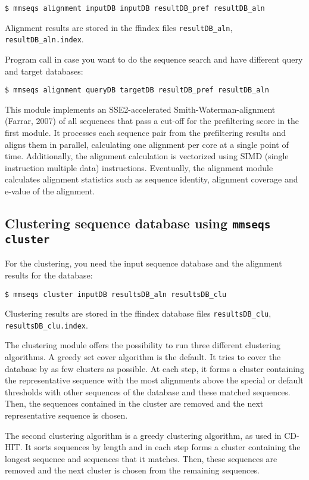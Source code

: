 \documentclass[11pt,a4paper]{report}
\begin{document}
\texttt{\$ mmseqs alignment inputDB inputDB resultDB\_pref resultDB\_aln }

Alignment results are stored in the ffindex files \texttt{resultDB\_aln},
\texttt{resultDB\_aln.index}.

Program call in case you want to do the sequence search and have different
query and target databases:

\texttt{\$ mmseqs alignment queryDB targetDB resultDB\_pref resultDB\_aln }

This module implements an SSE2-accelerated Smith-Waterman-alignment
(Farrar, 2007) of all sequences that pass a cut-off for the prefiltering
score in the first module. It processes each sequence pair from the
prefiltering results and aligns them in parallel, calculating one
alignment per core at a single point of time. Additionally, the alignment
calculation is vectorized using SIMD (single instruction multiple
data) instructions. Eventually, the alignment module calculates alignment
statistics such as sequence identity, alignment coverage and e-value
of the alignment.


\subsection{Clustering sequence database using \texttt{mmseqs cluster}\label{sub:Clustering_module}}

For the clustering, you need the input sequence database and the alignment
results for the database:

\texttt{\$ mmseqs cluster inputDB resultsDB\_aln resultsDB\_clu}

Clustering results are stored in the ffindex database files \texttt{resultsDB\_clu},
\texttt{resultsDB\_clu.index}.

The clustering module offers the possibility to run three different
clustering algorithms. A greedy set cover algorithm is the default.
It tries to cover the database by as few clusters as possible. At
each step, it forms a cluster containing the representative sequence
with the most alignments above the special or default thresholds with
other sequences of the database and these matched sequences. Then,
the sequences contained in the cluster are removed and the next representative
sequence is chosen.

The second clustering algorithm is a greedy clustering algorithm, as
used in CD-HIT. It sorts sequences by length and in each step forms
a cluster containing the longest sequence and sequences that it matches.
Then, these sequences are removed and the next cluster is chosen from
the remaining sequences.
\end{document}
